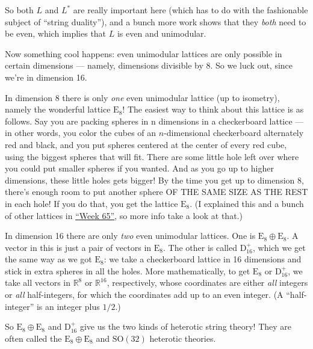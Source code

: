\documentclass{article}
\begin{document}
So both \(L\) and \(L^*\) are really important here (which has to do
with the fashionable subject of ``string duality''), and a bunch more
work shows that they \emph{both} need to be even, which implies that
\(L\) is even and unimodular.

Now something cool happens: even unimodular lattices are only possible
in certain dimensions --- namely, dimensions divisible by 8. So we luck
out, since we're in dimension 16.

In dimension 8 there is only \emph{one} even unimodular lattice (up to
isometry), namely the wonderful lattice \(\mathrm{E}_8\)! The easiest
way to think about this lattice is as follows. Say you are packing
spheres in n dimensions in a checkerboard lattice --- in other words,
you color the cubes of an \(n\)-dimensional checkerboard alternately red
and black, and you put spheres centered at the center of every red cube,
using the biggest spheres that will fit. There are some little hole left
over where you could put smaller spheres if you wanted. And as you go up
to higher dimensions, these little holes gets bigger! By the time you
get up to dimension 8, there's enough room to put another sphere OF THE
SAME SIZE AS THE REST in each hole! If you do that, you get the lattice
\(\mathrm{E}_8\). (I explained this and a bunch of other lattices in
\protect\hyperlink{week65}{``Week 65''}, so more info take a look at
that.)

In dimension 16 there are only \emph{two} even unimodular lattices. One
is \(\mathrm{E}_8\oplus\mathrm{E}_8\). A vector in this is just a pair
of vectors in \(\mathrm{E}_8\). The other is called
\(\mathrm{D}_{16}^+\), which we get the same way as we got
\(\mathrm{E}_8\): we take a checkerboard lattice in 16 dimensions and
stick in extra spheres in all the holes. More mathematically, to get
\(\mathrm{E}_8\) or \(\mathrm{D}_{16}^+\), we take all vectors in
\(\mathbb{R}^8\) or \(\mathbb{R}^{16}\), respectively, whose coordinates
are either \emph{all} integers or \emph{all} half-integers, for which
the coordinates add up to an even integer. (A ``half-integer'' is an
integer plus \(1/2\).)

So \(\mathrm{E}_8\oplus\mathrm{E}_8\) and \(\mathrm{D}_{16}^+\) give us
the two kinds of heterotic string theory! They are often called the
\(\mathrm{E}_8\oplus\mathrm{E}_8\) and \(\mathrm{SO}(32)\) heterotic
theories.
\end{document}

